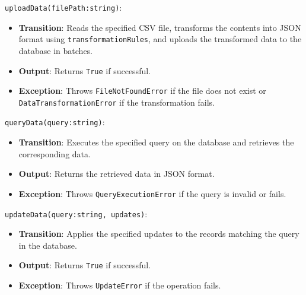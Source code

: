 \documentclass[12pt, titlepage]{article}
\begin{document}
\begin{description}
  \texttt{uploadData(filePath:string)}:
  \item
  \begin{itemize}
    \item \textbf{Transition}: Reads the specified CSV file, transforms the contents into
    JSON format using \texttt{transformationRules}, and uploads the transformed data to
    the database in batches.
  \end{itemize}
  \item
  \begin{itemize}
    \item \textbf{Output}: Returns \texttt{True} if successful.
  \end{itemize}
  \item
  \begin{itemize}
    \item \textbf{Exception}: Throws \texttt{FileNotFoundError} if the file does not exist or
    \\ \texttt{DataTransformationError} if the transformation fails.
  \end{itemize}
  \item


\texttt{queryData(query:string)}:
  \item
  \begin{itemize}
    \item \textbf{Transition}: Executes the specified query on the database and retrieves the
    corresponding data.
  \end{itemize}
  \item 
  \begin{itemize}
    \item \textbf{Output}: Returns the retrieved data in JSON format.
  \end{itemize}
  \item
  \begin{itemize}
    \item \textbf{Exception}: Throws \texttt{QueryExecutionError} if the query
    is invalid or fails.
  \end{itemize}
  \item

\texttt{updateData(query:string, updates)}:
  \item
  \begin{itemize}
    \item \textbf{Transition}: Applies the specified updates to the records matching the query
    in the database.
  \end{itemize}
  \item
  \begin{itemize}
    \item \textbf{Output}: Returns \texttt{True} if successful.
  \end{itemize}
  \item
  \begin{itemize}
    \item \textbf{Exception}: Throws \texttt{UpdateError} if the operation fails.
  \end{itemize}
  \item


\end{description}
\end{document}
